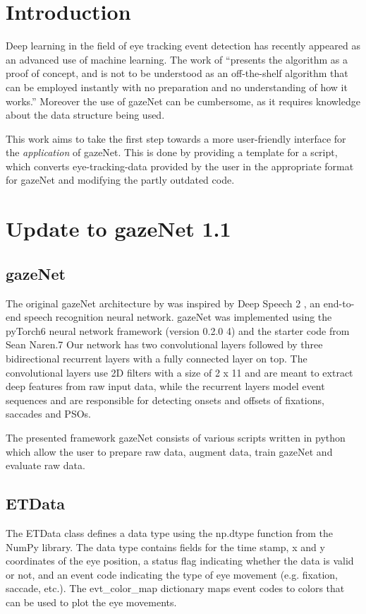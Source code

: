 \documentclass[conference]{IEEEtran}
\begin{document}
\section{Introduction}
Deep learning in the field of eye tracking event detection has recently appeared as an advanced use of machine learning. The work of \citet*{zemblys2018gazeNet} ``presents the algorithm as a proof of concept, and is not to be understood as an off-the-shelf algorithm that can be employed instantly with no preparation and no understanding of how it works.'' \citet*{zemblys2018gazeNet} Moreover the use of gazeNet can be cumbersome, as it requires knowledge about the data structure being used.

This work aims to take the first step towards a more user-friendly interface for the \emph{application} of gazeNet. This is done by providing a template for a script, which converts eye-tracking-data provided by the user in the appropriate format for gazeNet and modifying the partly outdated code.


\section{Update to gazeNet 1.1}
\subsection{gazeNet}
The original gazeNet architecture by \citet{zemblys2018gazeNet} was inspired by Deep Speech 2 \citeauthor{deep_speech_2}, an end-to-end speech recognition neural network. gazeNet was implemented using the pyTorch6 neural network framework (version 0.2.0 4) and the starter code from Sean Naren.7 Our network has two convolutional layers followed by three bidirectional recurrent layers with a fully connected layer on top. The convolutional layers use 2D filters with a size of 2 x 11 and are meant to extract deep features from raw input data, while the recurrent layers model event sequences and are responsible for detecting onsets and offsets of fixations, saccades and PSOs. \citet{zemblys2018gazeNet}

The presented framework gazeNet consists of various scripts written in python which allow the user to prepare raw data, augment data, train gazeNet and evaluate raw data.

\subsection{ETData}
The ETData class defines a data type using the np.dtype function from the NumPy library. The data type contains fields for the time stamp, x and y coordinates of the eye position, a status flag indicating whether the data is valid or not, and an event code indicating the type of eye movement (e.g. fixation, saccade, etc.). The evt\_color\_map dictionary maps event codes to colors that can be used to plot the eye movements.
\end{document}
